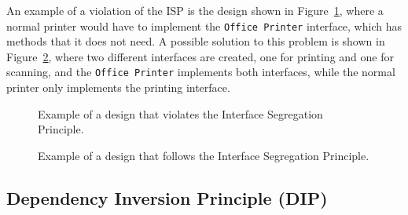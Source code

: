 An example of a violation of the ISP is the design shown in Figure~\ref{fig:isp-violation}, where a normal printer would have to implement the \texttt{Office Printer} interface, which has methods that it does not need. A possible solution to this problem is shown in Figure~\ref{fig:isp-follow}, where two different interfaces are created, one for printing and one for scanning, and the \texttt{Office Printer} implements both interfaces, while the normal printer only implements the printing interface.
\begin{figure}
    \centering
    \caption{Example of a design that violates the Interface Segregation Principle.}
    \label{fig:isp-violation}
\end{figure}
\begin{figure}
    \centering
    \caption{Example of a design that follows the Interface Segregation Principle.}
    \label{fig:isp-follow}
\end{figure}


\subsection{Dependency Inversion Principle (DIP)}

